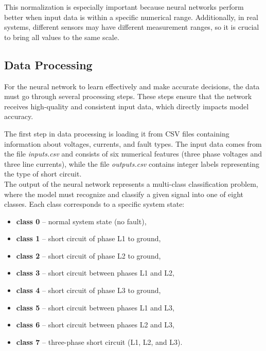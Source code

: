 \documentclass[11pt]{IEEEtran}
\begin{document}
This normalization is especially important because neural networks perform better when input data is within a specific numerical range. Additionally, in real systems, different sensors may have different measurement ranges, so it is crucial to bring all values to the same scale.

\subsection{Data Processing}

For the neural network to learn effectively and make accurate decisions, the data must go through several processing steps. These steps ensure that the network receives high-quality and consistent input data, which directly impacts model accuracy.

The first step in data processing is loading it from CSV files containing information about voltages, currents, and fault types. The input data comes from the file \textit{inputs.csv} and consists of six numerical features (three phase voltages and three line currents), while the file \textit{outputs.csv} contains integer labels representing the type of short circuit.\\


The output of the neural network represents a multi-class classification problem, where the model must recognize and classify a given signal into one of eight classes. Each class corresponds to a specific system state:

\begin{itemize}
    \item \textbf{class 0} – normal system state (no fault),
    \item \textbf{class 1} – short circuit of phase L1 to ground,
    \item \textbf{class 2} – short circuit of phase L2 to ground,
    \item \textbf{class 3} – short circuit between phases L1 and L2,
    \item \textbf{class 4} – short circuit of phase L3 to ground,
    \item \textbf{class 5} – short circuit between phases L1 and L3,
    \item \textbf{class 6} – short circuit between phases L2 and L3,
    \item \textbf{class 7} – three-phase short circuit (L1, L2, and L3).
\end{itemize}
\end{document}
